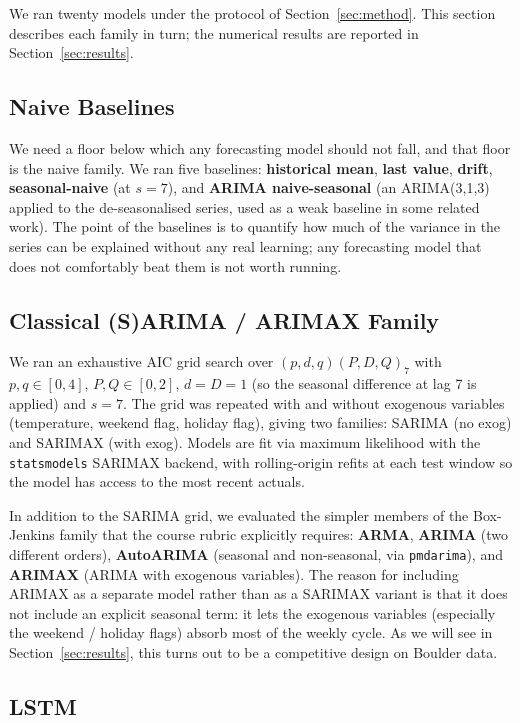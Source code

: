 We ran twenty models under the protocol of Section~\ref{sec:method}.
This section describes each family in turn; the numerical results are
reported in Section~\ref{sec:results}.

\subsection{Naive Baselines}

We need a floor below which any forecasting model should not fall, and
that floor is the naive family. We ran five baselines:
\textbf{historical mean}, \textbf{last value}, \textbf{drift},
\textbf{seasonal-naive} (at $s=7$), and \textbf{ARIMA naive-seasonal}
(an ARIMA(3,1,3) applied to the de-seasonalised series, used as a
weak baseline in some related work). The point of the baselines is to
quantify how much of the variance in the series can be explained
without any real learning; any forecasting model that does not
comfortably beat them is not worth running.

\subsection{Classical (S)ARIMA / ARIMAX Family}

We ran an exhaustive AIC grid search over $(p, d, q)(P, D, Q)_7$ with
$p, q \in [0, 4]$, $P, Q \in [0, 2]$, $d = D = 1$ (so the seasonal
difference at lag 7 is applied) and $s = 7$. The grid was repeated
with and without exogenous variables (temperature, weekend flag,
holiday flag), giving two families: SARIMA (no exog) and SARIMAX (with
exog). Models are fit via maximum likelihood with the
\texttt{statsmodels} SARIMAX backend, with rolling-origin refits at
each test window so the model has access to the most recent actuals.

In addition to the SARIMA grid, we evaluated the simpler members of
the Box-Jenkins family that the course rubric explicitly requires:
\textbf{ARMA}, \textbf{ARIMA} (two different orders),
\textbf{AutoARIMA} (seasonal and non-seasonal, via \texttt{pmdarima}),
and \textbf{ARIMAX} (ARIMA with exogenous variables). The reason for
including ARIMAX as a separate model rather than as a SARIMAX variant
is that it does not include an explicit seasonal term: it lets the
exogenous variables (especially the weekend / holiday flags) absorb
most of the weekly cycle. As we will see in Section~\ref{sec:results},
this turns out to be a competitive design on Boulder data.

\subsection{LSTM}

